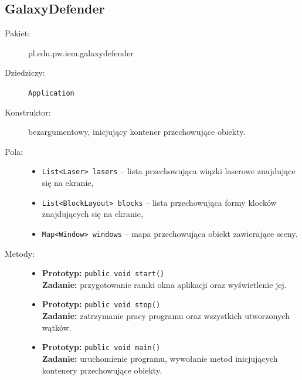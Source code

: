 \documentclass[a4paper]{article}
\newcommand{\prog}{\texttt}
\begin{document}
\subsection{GalaxyDefender}
\begin{description}
    \item[Pakiet:] pl.edu.pw.iem.galaxydefender
    \item[Dziedziczy:] \prog{Application}
    \item[Konstruktor:] bezargumentowy, inicjujący kontener przechowujące obiekty.
    \item[Pola:] \hfill
    \begin{itemize}
        \item \prog{List<Laser> lasers} -- lista przechowująca wiązki laserowe znajdujące się na ekranie,
        \item \prog{List<BlockLayout> blocks} -- lista przechowująca formy klocków znajdujących się na ekranie,
        \item \prog{Map<Window> windows} -- mapa przechowująca obiekt zawierające sceny.
    \end{itemize}
    \item[Metody:] \hfill
    \begin{itemize}
        \item \textbf{Prototyp:} \prog{public void start()}\\\textbf{Zadanie:} przygotowanie ramki okna aplikacji oraz wyświetlenie jej.
        \item \textbf{Prototyp:} \prog{public void stop()}\\\textbf{Zadanie:} zatrzymanie pracy programu oraz wszystkich utworzonych wątków.
        \item \textbf{Prototyp:} \prog{public void main()}\\\textbf{Zadanie:} uruchomienie programu, wywołanie metod inicjujących kontenery przechowujące obiekty.
    \end{itemize} 
\end{description}
\end{document}
